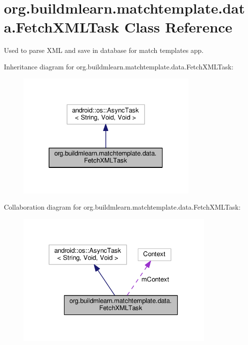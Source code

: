 \hypertarget{classorg_1_1buildmlearn_1_1matchtemplate_1_1data_1_1FetchXMLTask}{}\section{org.\+buildmlearn.\+matchtemplate.\+data.\+Fetch\+X\+M\+L\+Task Class Reference}
\label{classorg_1_1buildmlearn_1_1matchtemplate_1_1data_1_1FetchXMLTask}


Used to parse X\+ML and save in database for match template\textquotesingle{}s app.  




Inheritance diagram for org.\+buildmlearn.\+matchtemplate.\+data.\+Fetch\+X\+M\+L\+Task\+:
\nopagebreak
\begin{figure}[H]
\begin{center}
\leavevmode
\includegraphics[width=255pt]{classorg_1_1buildmlearn_1_1matchtemplate_1_1data_1_1FetchXMLTask__inherit__graph}
\end{center}
\end{figure}


Collaboration diagram for org.\+buildmlearn.\+matchtemplate.\+data.\+Fetch\+X\+M\+L\+Task\+:
\nopagebreak
\begin{figure}[H]
\begin{center}
\leavevmode
\includegraphics[width=279pt]{classorg_1_1buildmlearn_1_1matchtemplate_1_1data_1_1FetchXMLTask__coll__graph}
\end{center}
\end{figure}
